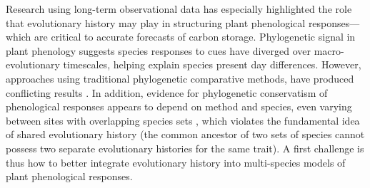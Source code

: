 \documentclass[11pt]{article}
\begin{document}

 
Research using long-term observational data has especially highlighted the role that evolutionary history may play in structuring plant phenological responses---which are critical to accurate forecasts of carbon storage. Phylogenetic signal in plant phenology \citep{kochmer1986constraints,willis2008phylogenetic,davies2013phylogenetic} suggests species responses to cues have diverged over macro-evolutionary timescales, helping explain species present day differences. 
However, approaches using traditional phylogenetic comparative methods, have produced conflicting results \citep[e.g.,][]{willis2008phylogenetic,CaraDonna2015,yang2021afm}. In addition, evidence for phylogenetic conservatism of phenological responses appears to depend on method and species, even varying between sites with overlapping species sets \citep[e.g.,][]{rafferty2017global}, which violates the fundamental idea of shared evolutionary history (the common ancestor of two sets of species cannot possess two separate evolutionary histories for the same trait). A first challenge is thus how to better integrate evolutionary history into multi-species models of plant phenological responses.
\end{document}
